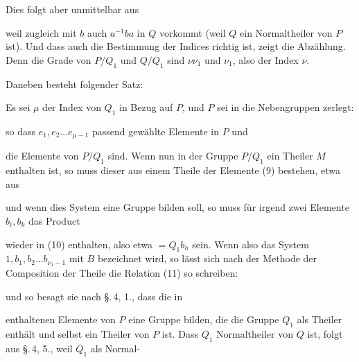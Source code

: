 Dies folgt aber unmittelbar aus


weil zugleich mit $b$ auch $a^{-1} b a$ in $Q$ vorkommt (weil $Q$ ein
Normaltheiler von $P$ ist). Und dass auch die Bestimmung der
Indices richtig ist, zeigt die Abzählung. Denn die Grade von
$P/Q_1$ und $Q/Q_1$ sind $\nu \nu_1$ und $\nu_1$, also der Index $\nu$.

Daneben besteht folgender Satz:


Es sei $\mu$ der Index von $Q_1$ in Bezug auf $P$, und $P$ sei in
die Nebengruppen zerlegt:


so dass $e_1, e_2 \ldots e_{\mu - 1}$ passend gewählte Elemente in $P$ und


die Elemente von $P/Q_1$ sind. Wenn nun in der Gruppe $P/Q_1$
ein Theiler $M$ enthalten ist, so muss dieser aus einem Theile
der Elemente (9) bestehen, etwa aus


und wenn dies System eine Gruppe bilden soll, so muss für
irgend zwei Elemente $b_i, b_k$ das Product


wieder in (10) enthalten, also etwa $= Q_1 b_h$ sein. Wenn also
das System $1, b_1, b_2 \ldots b_{\nu_1 - 1}$ mit $B$ bezeichnet wird, so lässt
sich nach der Methode der Composition der Theile die Relation
 (11) so schreiben:


und so besagt sie nach \S.\,4, 1., dass die in


enthaltenen Elemente von $P$ eine Gruppe bilden, die die Gruppe
$Q_1$ als Theiler enthält und selbst ein Theiler von $P$ ist. Dass
$Q_1$ Normaltheiler von $Q$ ist, folgt aus \S.\,4, 5., weil $Q_1$ als Normal-
